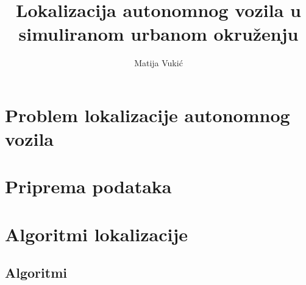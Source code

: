 \documentclass[times, utf8, diplomski]{fer}
\begin{document}

\title{Lokalizacija autonomnog vozila u simuliranom urbanom okruženju}

\author{Matija Vukić}

\maketitle

\izvornik


\tableofcontents


\chapter{Problem lokalizacije autonomnog vozila}



\chapter{Priprema podataka}







\chapter{Algoritmi lokalizacije}



\section{Algoritmi}



% 




\end{document}
